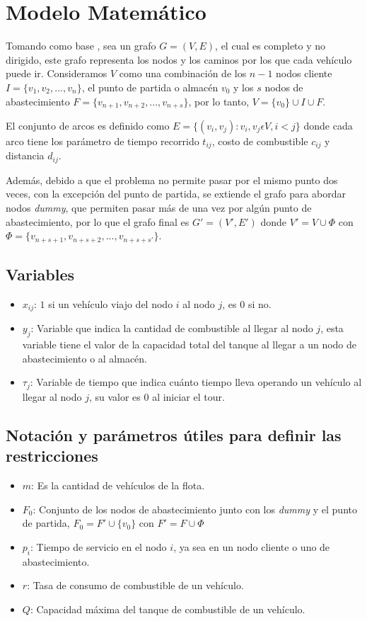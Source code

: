 \documentclass[letter, 10pt]{article}
\begin{document}
\section{Modelo Matem\'atico}
Tomando como base \cite{G-VRP}, sea un grafo \(G = (V, E)\), el cual es completo y no dirigido, este grafo representa los nodos y los caminos por los que cada vehículo puede ir. Consideramos \(V\) como una combinación de los \(n-1\) nodos cliente \(I = \lbrace v_1, v_2, ..., v_n \rbrace\), el punto de partida o almacén \(v_0\) y los \(s\) nodos de abastecimiento \(F = \lbrace v_{n+1}, v_{n+2}, ..., v_{n+s} \rbrace \), por lo tanto, \(V = \lbrace v_0 \rbrace \cup I \cup F \).

El conjunto de arcos es definido como \(E = \lbrace(v_i,v_j): v_i,v_j \epsilon V, i < j\rbrace\) donde cada arco tiene los parámetro de tiempo recorrido \(t_{ij}\), costo de combustible \(c_{ij}\) y distancia \(d_{ij}\).

Además, debido a que el problema no permite pasar por el mismo punto dos veces, con la excepción del punto de partida, se extiende el grafo para abordar nodos \textit{dummy}, que permiten pasar más de una vez por algún punto de abastecimiento, por lo que el grafo final es \(G' = (V',E')\) donde \(V' = V \cup \Phi\) con \(\Phi = \lbrace v_{n+s+1}, v_{n+s+2}, ..., v_{n+s+s'} \rbrace\).

\subsection{Variables}
\begin{itemize}
\item \(x_{ij}\): \(1\) si un vehículo viajo del nodo \(i\) al nodo \(j\), es \(0\) si no.
\item \(y_{j}\): Variable que indica la cantidad de combustible al llegar al nodo \(j\), esta variable tiene el valor
	de la capacidad total del tanque al llegar a un nodo de abastecimiento o al almacén.
\item \(\tau_j\): Variable de tiempo que indica cuánto tiempo lleva operando un vehículo al llegar al nodo \(j\),
	su valor es \(0\) al iniciar el tour.
\end{itemize}

\subsection{Notación y parámetros útiles para definir las restricciones}
\begin{itemize}
\item \(m\): Es la cantidad de vehículos de la flota.
\item \(F_0\): Conjunto de los nodos de abastecimiento junto con los \textit{dummy} y el punto de partida,
		 \(F_0 = F' \cup \lbrace v_0 \rbrace\) con \(F' = F \cup \Phi\)
\item \(p_i\): Tiempo de servicio en el nodo \(i\), ya sea en un nodo cliente o uno de abastecimiento.
\item \(r\): Tasa de consumo de combustible de un vehículo.
\item \(Q\): Capacidad máxima del tanque de combustible de un vehículo.
\end{itemize}
\end{document}
